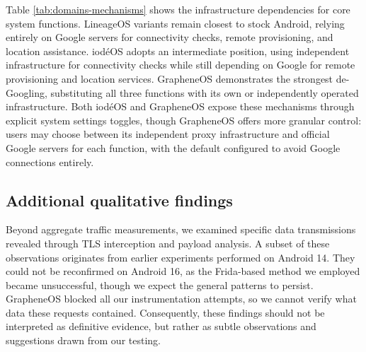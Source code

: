 \documentclass[runningheads]{llncs}
\begin{document}
Table \ref{tab:domains-mechanisms} shows the infrastructure dependencies for core system functions. LineageOS variants remain closest to stock Android, relying entirely on Google servers for connectivity checks, remote provisioning, and location assistance. iod\'eOS adopts an intermediate position, using independent infrastructure for connectivity checks while still depending on Google for remote provisioning and location services. GrapheneOS demonstrates the strongest de-Googling, substituting all three functions with its own or independently operated infrastructure. Both iod\'eOS and GrapheneOS expose these mechanisms through explicit system settings toggles, though GrapheneOS offers more granular control: users may choose between its independent proxy infrastructure and official Google servers for each function, with the default configured to avoid Google connections entirely.

\begin{table}
	\caption{Domains observed for connectivity check, remote provisioning, and location assistance; ``--'' means not observed.}\label{tab:domains-mechanisms}
	\centering
\end{table}

\subsection{Additional qualitative findings}

Beyond aggregate traffic measurements, we examined specific data transmissions revealed through TLS interception and payload analysis. A subset of these observations originates from earlier experiments performed on Android 14. They could not be reconfirmed on Android 16, as the Frida-based method we employed became unsuccessful, though we expect the general patterns to persist. GrapheneOS blocked all our instrumentation attempts, so we cannot verify what data these requests contained. Consequently, these findings should not be interpreted as definitive evidence, but rather as subtle observations and suggestions drawn from our testing.
\end{document}

